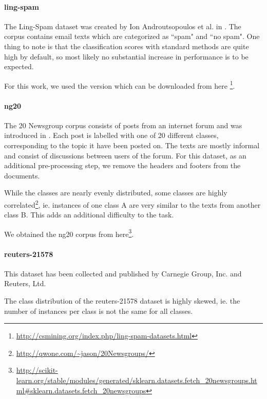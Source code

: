 
\paragraph{ling-spam}
The Ling-Spam dataset was created by Ion Androutsopoulos et al. in  \cite{Androutsopoulos2000}.
The corpus contains email texts which are categorized as ``spam" and ``no spam".
One thing to note is that the classification scores with standard methods are quite high by default, so most likely no substantial increase in performance is to be expected.

For this work, we used the version which can be downloaded from here \footnote{\url{http://csmining.org/index.php/ling-spam-datasets.html}}.


\paragraph{ng20}
The 20 Newsgroup corpus consists of posts from an internet forum and was introduced in \cite{Lang}. Each post is labelled with one of 20 different classes, corresponding to the topic it have been posted on. The texts are mostly informal and consist of discussions between users of the forum.
For this dataset, as an additional pre-processing step, we remove the headers and footers from the documents.

While the classes are nearly evenly distributed, some classes are highly correlated\footnote{\url{http://qwone.com/~jason/20Newsgroups/}}, ie. instances of one class A are very similar to the texts from another class B. This adds an additional difficulty to the task.

We obtained the ng20 corpus from here\footnote{\url{http://scikit-learn.org/stable/modules/generated/sklearn.datasets.fetch\_20newsgroups.html\#sklearn.datasets.fetch_20newsgroups}}.

\paragraph{reuters-21578}
This dataset has been collected and published by Carnegie Group, Inc. and Reuters, Ltd.

The class distribution of the reuters-21578 dataset is highly skewed, ie. the number of instances per class is not the same for all classes. 


